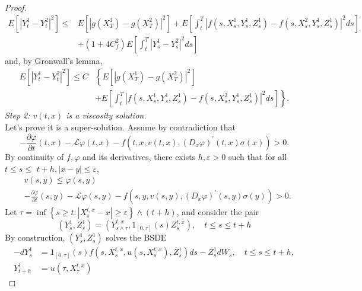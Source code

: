 \begin{proof}
\begin{equation}
	\begin{aligned}
		E\left[\left|Y_t^1-Y_t^2\right|^2\right] \leq & E\left[\left|g\left(X_T^1\right)-g\left(X_T^2\right)\right|^2\right]+E\left[\int_t^T\left|f\left(s, X_s^1, Y_s^1, Z_s^1\right)-f\left(s, X_s^2, Y_s^1, Z_s^1\right)\right|^2 d s\right] \\
		& +\left(1+4 C_f^2\right) E\left[\int_t^T\left|Y_s^1-Y_s^2\right|^2 d s\right]
	\end{aligned}
\end{equation}
and, by Gronwall's lemma,
\begin{equation}
	\begin{aligned}
		E\left[\left|Y_t^1-Y_t^2\right|^2\right] \leq C & \left\{E\left[\left|g\left(X_T^1\right)-g\left(X_T^2\right)\right|^2\right]\right. \\
		& \left.+E\left[\int_t^T\left|f\left(s, X_s^1, Y_s^1, Z_s^1\right)-f\left(s, X_s^2, Y_s^1, Z_s^1\right)\right|^2 d s\right]\right\} .
	\end{aligned}
\end{equation}
\textit{Step 2: $v(t,x)$ is a viscosity solution.}\\
Let's prove it is a super-solution. Assume by contradiction that
\begin{equation}
	-\frac{\partial \varphi}{\partial t}(t, x)-\mathcal{L} \varphi(t, x)-f\left(t, x, v(t, x),\left(D_x \varphi\right)^{\prime}(t, x) \sigma(x)\right)>0.
\end{equation}
By continuity of $f, \varphi$ and its derivatives, there exists $h, \varepsilon>0$ such that for all $t \leq s \leq$ $t+h,|x-y| \leq \varepsilon$,
$$
\begin{aligned}
	& v(s, y) \leq \varphi(s, y) \\
	&-\frac{\partial \varphi}{\partial t}(s, y)-\mathcal{L} \varphi(s, y)-f\left(s, y, v(s, y),\left(D_x \varphi\right)^{\prime}(s, y) \sigma(y)\right)>0 .
\end{aligned}
$$
Let $\tau=\inf \left\{s \geq t:\left|X_s^{t, x}-x\right| \geq \varepsilon\right\} \wedge(t+h)$, and consider the pair
$$
\left(Y_s^1, Z_s^1\right)=\left(Y_{s \wedge \tau}^{t, x}, 1_{[0, \tau]}(s) Z_s^{t, x}\right), \quad t \leq s \leq t+h
$$
By construction, $\left(Y_s^1, Z_s^1\right)$ solves the BSDE
$$
\begin{aligned}
	-d Y_s^1 & =1_{[0, \tau]}(s) f\left(s, X_s^{t, x}, u\left(s, X_s^{t, x}\right), Z_s^1\right) d s-Z_s^1 d W_s, \quad t \leq s \leq t+h, \\
	Y_{t+h}^1 & =u\left(\tau, X_\tau^{t, x}\right)

\end{aligned}$$
\end{proof}
